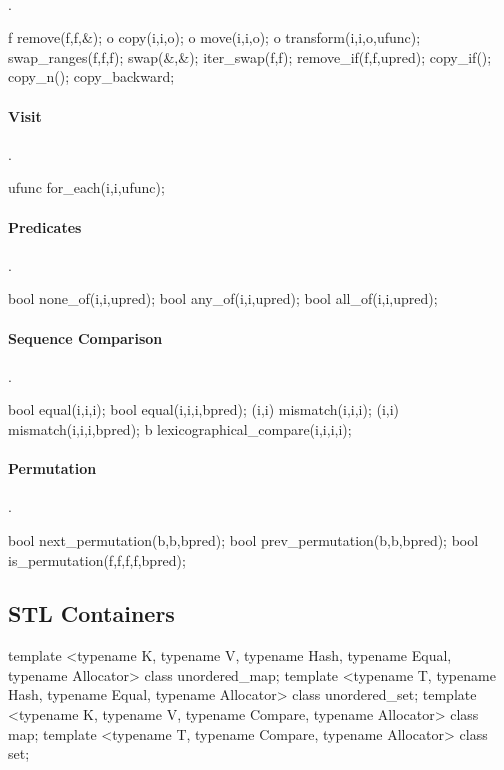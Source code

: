 \paragraph{}{.}
\begin{code}
f remove(f,f,&); o copy(i,i,o); o move(i,i,o);
o transform(i,i,o,ufunc);
swap_ranges(f,f,f); swap(&,&); iter_swap(f,f);
remove_if(f,f,upred); copy_if(); copy_n(); copy_backward;
\end{code}

\paragraph{Visit}{.}
\begin{code}
ufunc for_each(i,i,ufunc);
\end{code}

\paragraph{Predicates}{.}
\begin{code}
bool none_of(i,i,upred);
bool any_of(i,i,upred);
bool all_of(i,i,upred);
\end{code}

\paragraph{Sequence Comparison}{.}
\begin{code}
bool equal(i,i,i); bool equal(i,i,i,bpred);
(i,i) mismatch(i,i,i); (i,i) mismatch(i,i,i,bpred);
b lexicographical_compare(i,i,i,i);
\end{code}

\paragraph{Permutation}{.}
\begin{code}
bool next_permutation(b,b,bpred);
bool prev_permutation(b,b,bpred);
bool is_permutation(f,f,f,f,bpred);
\end{code}

\subsection*{STL Containers}
\begin{nametablel}
\end{nametablel}

\begin{code}
template <typename K, typename V,
          typename Hash, typename Equal,
          typename Allocator>
class unordered_map;
template <typename T,
          typename Hash, typename Equal,
          typename Allocator>
class unordered_set;
template <typename K, typename V,
          typename Compare,
          typename Allocator>
class map;
template <typename T,
          typename Compare,
          typename Allocator>
class set;
\end{code}

